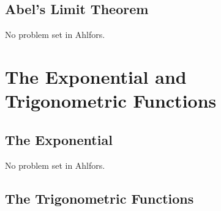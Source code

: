 \subsection{Abel's Limit Theorem}

No problem set in Ahlfors.

\section{The Exponential and Trigonometric Functions}

\subsection{The Exponential}

No problem set in Ahlfors.

\subsection{The Trigonometric Functions}

